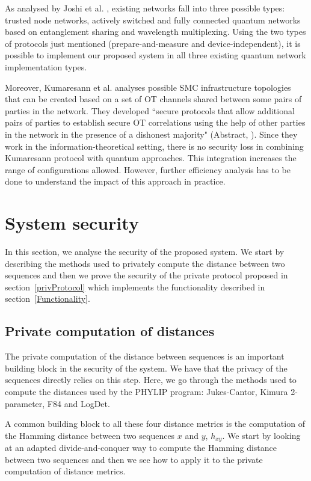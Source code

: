 As analysed by Joshi et al. \cite{JAW20}, existing networks fall into three possible types: trusted node networks, actively switched and fully connected quantum networks based on entanglement sharing and wavelength multiplexing. Using the two types of protocols just mentioned (prepare-and-measure and device-independent), it is possible to implement our proposed system in all three existing quantum network implementation types.

Moreover, Kumaresann et al. \cite{KRS16} analyses possible SMC infrastructure topologies that can be created based on a set of OT channels shared between some pairs of parties in the network. They developed ``secure protocols that allow additional pairs of parties to establish secure OT correlations using the help of other parties in the network in the presence of a dishonest majority" (Abstract, \cite{KRS16}). Since they work in the information-theoretical setting, there is no security loss in combining Kumaresann protocol with quantum approaches. This integration increases the range of configurations allowed. However, further efficiency analysis has to be done to understand the impact of this approach in practice.



\section{System security}\label{systemSecurity}

In this section, we analyse the security of the proposed system. We start by describing the methods used to privately compute the distance between two sequences and then we prove the security of the private protocol proposed in section~\ref{privProtocol} which implements the functionality described in section~\ref{Functionality}.


\subsection{Private computation of distances} \label{privDistances}

The private computation of the distance between sequences is an important building block in the security of the system. We have that the privacy of the sequences directly relies on this step. Here, we go through the methods used to compute the distances used by the PHYLIP program: Jukes-Cantor, Kimura 2-parameter, F84 and LogDet.

A common building block to all these four distance metrics is the computation of the Hamming distance between two sequences $x$ and $y$, $h_{xy}$. We start by looking at an adapted divide-and-conquer way to compute the Hamming distance between two sequences and then we see how to apply it to the private computation of distance metrics.

